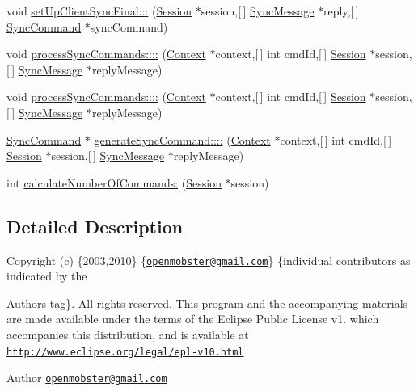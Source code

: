 \begin{DoxyCompactItemize}
\item 
void \hyperlink{interface_sync_helper_a52073dfff575ed4ff2da93d039051125}{set\-Up\-Client\-Sync\-Final\-:::} (\hyperlink{interface_session}{\-Session} $\ast$session,\mbox{[}$\,$\mbox{]} \hyperlink{interface_sync_message}{\-Sync\-Message} $\ast$reply,\mbox{[}$\,$\mbox{]} \hyperlink{interface_sync_command}{\-Sync\-Command} $\ast$sync\-Command)
\item 
void \hyperlink{interface_sync_helper_a23c00192de5175e341a6ed6d7186be51}{process\-Sync\-Commands\-::::} (\hyperlink{interface_context}{\-Context} $\ast$context,\mbox{[}$\,$\mbox{]} int cmd\-Id,\mbox{[}$\,$\mbox{]} \hyperlink{interface_session}{\-Session} $\ast$session,\mbox{[}$\,$\mbox{]} \hyperlink{interface_sync_message}{\-Sync\-Message} $\ast$reply\-Message)
\item 
void \hyperlink{interface_sync_helper_a23c00192de5175e341a6ed6d7186be51}{process\-Sync\-Commands\-::::} (\hyperlink{interface_context}{\-Context} $\ast$context,\mbox{[}$\,$\mbox{]} int cmd\-Id,\mbox{[}$\,$\mbox{]} \hyperlink{interface_session}{\-Session} $\ast$session,\mbox{[}$\,$\mbox{]} \hyperlink{interface_sync_message}{\-Sync\-Message} $\ast$reply\-Message)
\item 
\hyperlink{interface_sync_command}{\-Sync\-Command} $\ast$ \hyperlink{interface_sync_helper_a064e2513483268fcc2beb49f22eb4ae1}{generate\-Sync\-Command\-::::} (\hyperlink{interface_context}{\-Context} $\ast$context,\mbox{[}$\,$\mbox{]} int cmd\-Id,\mbox{[}$\,$\mbox{]} \hyperlink{interface_session}{\-Session} $\ast$session,\mbox{[}$\,$\mbox{]} \hyperlink{interface_sync_message}{\-Sync\-Message} $\ast$reply\-Message)
\item 
int \hyperlink{interface_sync_helper_ab10870648382b24787b9023032432375}{calculate\-Number\-Of\-Commands\-:} (\hyperlink{interface_session}{\-Session} $\ast$session)
\end{DoxyCompactItemize}


\subsection{\-Detailed \-Description}
\-Copyright (c) \{2003,2010\} \{\href{mailto:openmobster@gmail.com}{\tt openmobster@gmail.\-com}\} \{individual contributors as indicated by the \begin{DoxyAuthor}{\-Authors}
tag\}. \-All rights reserved. \-This program and the accompanying materials are made available under the terms of the \-Eclipse \-Public \-License v1. which accompanies this distribution, and is available at \href{http://www.eclipse.org/legal/epl-v10.html}{\tt http\-://www.\-eclipse.\-org/legal/epl-\/v10.\-html}
\end{DoxyAuthor}
\begin{DoxyAuthor}{\-Author}
\href{mailto:openmobster@gmail.com}{\tt openmobster@gmail.\-com} 
\end{DoxyAuthor}


